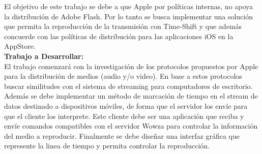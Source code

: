 El objetivo de este trabajo se debe a que Apple por pol\'iticas internas, no apoya la distribuci\'on de Adobe Flash. Por lo tanto se busca implementar una soluci\'on que permita la reproducci\'on de la transmisi\'on con Time-Shift y que adem\'as concuerde con las pol\'iticas de distribuci\'on para las aplicaciones iOS en la AppStore.\\
 
\large
\textbf{Trabajo a Desarrollar:}\\

\normalsize
El trabajo comenzar\'a con la investigaci\'on de los protocolos propuestos por Apple para la distribuci\'on de medios (audio y/o video). En base a estos protocolos buscar similitudes con el sistema de streaming para computadores de escritorio. Adem\'as se debe implementar un m\'etodo de marcaci\'on de tiempo en el stream de datos destinado a dispositivos m\'oviles, de forma que el servidor los env\'ie para que el cliente los interprete. Este cliente debe ser una aplicaci\'on que reciba y env\'ie comandos compatibles con el servidor Wowza para controlar la informaci\'on del medio a reproducir. Finalmente se debe dise\~nar una interfaz gr\'afica que represente la linea de tiempo y permita controlar la reproducci\'on.\\

